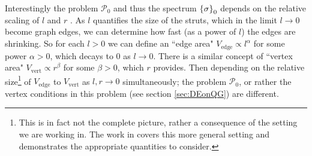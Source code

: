 Interestingly the problem $\mathcal{P}_0$ and thus the spectrum $\left\{ \sigma \right\}_0$ depends on the relative scaling of $l$ and $r$ \cite{exner2005convergence}.
As $l$ quantifies the size of the struts, which in the limit $l\rightarrow0$ become graph edges, we can determine how fast (as a power of $l$) the edges are shrinking.
So for each $l>0$ we can define an ``edge area" $V_{\mathrm{edge}} \propto l^{\alpha}$ for some power $\alpha>0$, which decays to 0 as $l\rightarrow0$.
There is a similar concept of ``vertex area" $V_{\mathrm{vert}} \propto r^{\beta}$ for some $\beta>0$, which $r$ provides.
Then depending on the relative size\footnote{This is in fact not the complete picture, rather a consequence of the setting we are working in. The work in \cite{exner2013general} covers this more general setting and demonstrates the appropriate quantities to consider.} of $V_{\mathrm{edge}}$ to $V_{\mathrm{vert}}$ as $l,r\rightarrow0$ simultaneously; the problem $\mathcal{P}_0$, or rather the vertex conditions in this problem (see section \ref{sec:DEonQG}) are different.
